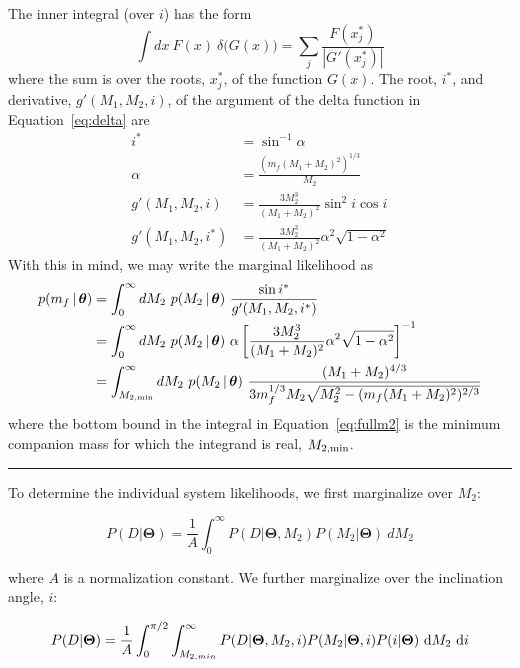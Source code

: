 \documentclass[letterpaper,12pt,preprint]{aastex}
\newcommand{\given}{\,|\,}
\newcommand{\bs}[1]{\boldsymbol{#1}}
\begin{document}
The inner integral (over $i$) has the form
\begin{equation}
    \int dx~F(x)~\delta{(G(x)}) = \sum_j \frac{F(x^*_j)}{|G'(x^*_j)|}
\end{equation}
where the sum is over the roots, $x^*_j$, of the function $G(x)$. The root, $i^*$, and derivative, $g'(M_1,M_2,i)$, of the argument of the delta function in Equation~\ref{eq:delta} are 
\begin{align}
	i^* &= \sin^{-1}\alpha\\
	\alpha &= \frac{(m_f(M_1+M_2)^2)^{1/3}}{M_2}\\
	g'(M_1,M_2,i) &= \frac{3M_2^3}{(M_1+M_2)^2}\sin^2 i \cos i\\
	g'(M_1,M_2,i^*) &= \frac{3M_2^3}{(M_1+M_2)^2} \alpha^2 \sqrt{1 - \alpha^2}
\end{align}
With this in mind, we may write the marginal likelihood as
\begin{align}
	p(m_f \given \bs{\theta}) &= \int_{0}^\infty dM_2~p(M_2 \given \bs{\theta})~\frac{\sin i^*}{g'(M_1,M_2,i^*)}\\
	&= \int_{0}^\infty dM_2~p(M_2 \given \bs{\theta})~\alpha\left[\frac{3M_2^3}{(M_1+M_2)^2} \alpha^2 \sqrt{1 - \alpha^2}\right]^{-1}\\
	&= \int_{M_{2,{\rm min}}}^\infty dM_2~p(M_2 \given \bs{\theta})~\frac{(M_1+M_2)^{4/3}}{3m_f^{1/3}M_2\sqrt{M_2^2 - (m_f(M_1+M_2)^2)^{2/3}}}\label{eq:fullm2}
\end{align}
where the bottom bound in the integral in Equation~\ref{eq:fullm2} is the minimum companion mass for which the integrand is real, $M_{2,{\rm min}}$.

\vspace{2em}
\hrule

To determine the individual system likelihoods, we first marginalize over $M_2$:

\begin{equation}
P(D|\mathbf{\Theta}) = \frac{1}{A} \int_0^{\infty} P(D |\mathbf{\Theta}, M_2) P(M_2|\mathbf{\Theta})\ dM_2 
\end{equation}

where $A$ is a normalization constant. We further marginalize over the inclination angle, $i$:

\begin{equation}
P(D|\mathbf{\Theta}) = \frac{1}{A} \int_0^{\pi/2} \int_{M_{2,min}}^{\infty} P(D | \mathbf{\Theta}, M_2, i) P(M_2|\mathbf{\Theta}, i) P(i | \mathbf{\Theta})\ {\rm d}M_2\ {\rm d}i
\end{equation}
\end{document}
